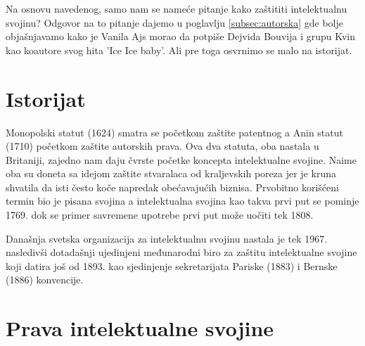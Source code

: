 \documentclass[a4paper]{article}
\begin{document}
Na osnovu navedenog, samo nam se nameće pitanje kako zaštititi intelektualnu svojinu? Odgovor na to pitanje
dajemo u poglavlju \ref{subsec:autorska} gde bolje objašnjavamo kako je Vanila Ajs morao da potpiše Dejvida Bouvija i grupu
Kvin kao koautore svog hita 'Ice Ice baby'. Ali pre toga osvrnimo se malo na istorijat.


\section{Istorijat}
Monopolski statut (1624) smatra se početkom zaštite patentnog a Anin statut (1710) početkom zaštite autorskih prava. Ova dva statuta, oba nastala u Britaniji, zajedno nam daju čvrste početke koncepta intelektualne svojine. Naime oba su doneta sa idejom zaštite stvaralaca od kraljevskih poreza jer je kruna shvatila da isti često koče napredak obećavajućih biznisa. Prvobitno korišćeni termin bio je pisana svojina a intelektualna svojina kao takva prvi put se pominje 1769. dok se primer savremene upotrebe prvi put može uočiti tek 1808. 

Današnja svetska organizacija za intelektualnu svojinu nastala je tek 1967. nasledivši dotadašnji ujedinjeni međunarodni biro za zaštitu intelektualne svojine koji datira još od 1893. kao sjedinjenje sekretarijata Pariske (1883) i Bernske (1886) konvencije.

\section{Prava intelektualne svojine}	
\label{sec:prava_int_svoj}
\end{document}
